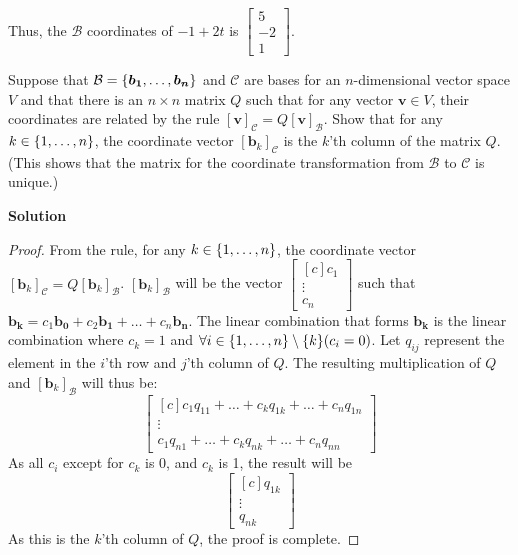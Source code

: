 \documentclass[11pt]{scrartcl}
\theoremstyle{dotlessP}
\theoremstyle{dotlessN}
\DeclarePairedDelimiter\set{\{}{\}}
\newcommand{\basis}{\mathcal{B}}
\begin{document}
Thus, the $\basis$ coordinates of $-1 +2t$ is $
\begin{bmatrix}
	5 \\
	-2 \\
	1
\end{bmatrix}
$.
\begin{ques}
	Suppose that $\basis = \set*{\bm{b_1}, \dots, \bm{b_n}}$ and $\mathcal{C}$ are bases for an $n$-dimensional vector space $V$ and that there is an $n \times n$ matrix $Q$ such that for any vector $\bm{v} \in V$, their coordinates are related by the rule $[\bm{v}]_\mathcal{C} = Q[\bm{v}]_\basis$. Show that for any $k \in \set*{1, \dots, n}$, the coordinate vector $[\bm{b}_k]_\mathcal{C}$ is the $k$'th column of the matrix $Q$. (This shows that the matrix for the coordinate transformation from $\basis$ to $\mathcal{C}$ is unique.)
\end{ques}
\textbf{Solution}
\begin{proof}
	From the rule, for any $k \in \set*{1, \dots, n}$, the coordinate vector $[\bm{b}_k]_\mathcal{C} = Q[\bm{b}_k]_\basis$. $[\bm{b}_k]_\basis$ will be the vector $
	\begin{bmatrix}[c]
	c_1 \\
	\vdots \\
	c_n
\end{bmatrix}$ such that 
$\bm{b_k} = c_1 \bm{b_0} + c_2 \bm{b_1} + \dots + c_n \bm{b_n}$. The linear combination that forms $\bm{b_k}$ is the linear combination where $c_k = 1$ and $\forall i \in \set*{1, \dots, n} \setminus \set*{k}(c_i = 0)$. Let $q_{ij}$ represent the element in the $i$'th row and $j$'th column of  $Q$. The resulting multiplication of  $Q$ and $[\bm{b}_k]_\basis$ will thus be:
\[
	\begin{bmatrix}[c]
	c_1 q_{11} + \dots + c_k q_{1k} + \dots + c_n q_{1n} \\
	\vdots\\ 
	c_1 q_{n1} + \dots + c_k q_{nk} + \dots + c_n q_{nn}
\end{bmatrix}
\] 
As all $c_i$ except for $c_k$ is 0, and $c_k$ is 1, the result will be
\[
	\begin{bmatrix}[c]
	q_{1k} \\
	\vdots \\
	q_{nk}
	\end{bmatrix}
	\]
	As this is the $k$'th column of $Q$, the proof is complete.
\end{proof}
\end{document}
